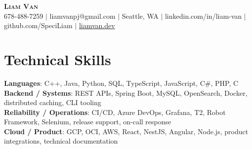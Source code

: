 \documentclass[letterpaper,11pt]{article}
\begin{document}

%
\begin{center}
    \textbf{\Huge \scshape Liam Van} \\ \vspace{1pt}
    \small 678-488-7259 $|$ \small {liamvanpj@gmail.com} $|$ Seattle, WA
 {{$|$ linkedin.com/in/liam-van} {$|$ github.com/SpeciLiam} {$|$ \href{https://liamvan.dev}{liamvan.dev}}}

\end{center}

\section{Technical Skills}
 \begin{itemize}[leftmargin=0.15in, label={}]
    \small{\item{
     \textbf{Languages}{: C++, Java, Python, SQL, TypeScript, JavaScript, C\#, PHP, C} \\
     \textbf{Backend / Systems}{: REST APIs, Spring Boot, MySQL, OpenSearch, Docker, distributed caching, CLI tooling} \\
     \textbf{Reliability / Operations}{: CI/CD, Azure DevOps, Grafana, T2, Robot Framework, Selenium, release support, on-call response} \\
     \textbf{Cloud / Product}{: GCP, OCI, AWS, React, NestJS, Angular, Node.js, product integrations, technical documentation} \\
    }}
 \end{itemize}
%

\end{document}
